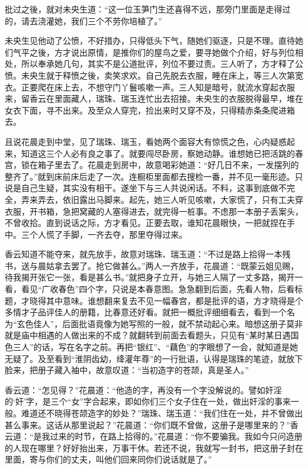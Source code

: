 \documentclass[a4paper,12pt,UTF8,twoside]{ctexbook}
\begin{document}
批过之後，就对未央生道：“这一位玉笋门生还喜得不远，那旁门里面是走得过的，请去浇灌她，我们三个不劳你培植了。”

未央生见他动了公愤，不好措办，只得低头下气，随她们驱逐，只是不理。直待她们气平之後，方才说出原情，是推你们的屋鸟之爱，要寻她做个介绍，好与列位相处，所以奉承她几句，其实不是公道批评，列位不要过责。三人听了，方才释了公愤。未央生就于释愤之後，卖笑求欢。自己先脱去衣服，睡在床上，等三人次第宽衣。正要爬在床上去，不想守门丫鬟咳嗽一声。三人知是暗号，就流水穿起衣服来，留香云在里面藏人，瑞珠、瑞玉连忙出去招接。未央生的衣服脱得最早，堆在女衣下面，寻不出来。及至众人穿完，捡出来时又穿不及，只得精赤条条爬进箱去。

且说花晨走到中堂，见了瑞珠、瑞玉，看她两个面容大有惊慌之色，心内疑惑起来，知道这三个人必有良之事了。就要闯尽卧房，察她动静。谁想她已把活跳的春宫，锁在箱子里去了。花晨走到房中，故意喝彩她道：“好几日不来，一发摆列的整齐了。”就到床前床后走了一次。连橱柜里面都去搜检一番，并不见一毫形迹。只说是自己生疑，其实没有相干。遂坐下与三人共说闲话。不料，这事到底做不完全，弄来弄去，依旧露出马脚来。起先，她三人听见咳嗽，大家慌了，只有工夫穿衣服，开书箱，急把窝藏的人塞得进去，就完得一桩事。不虑那一本册子丢案头，不曾收拾。直到说话之际，方才看见。正要去取，谁知花晨眼快，一把就捏在手中。三个人慌了手脚，一齐去夺，那里夺得过来。

香云知道不能夺来，就先放手，故意对瑞珠、瑞玉道：“不过是路上拾得一本残书，送与晨姑拿去罢了。抢它做甚么。”两人一齐放手，花晨道：“既蒙云姐见赐，待我揭开张它一张，看是甚么书。”就把身子立开，与她三人隔了一丈多路，揭开一看，看见“广收春色”四个字，只说是本春意图。急急翻到后面，先看人物，后看标题，才晓得其中意味。谁想翻来复去不见一幅春宫，都是批评的语，方才晓得是个多情才子品评佳人的册籍，比春意还好看。就把一概批评细细看去，看到一个名为“玄色佳人”，后面批语竟像为她写照的一般，就不禁动起心来。暗想这册子莫非就是庙中相遇的人做出来的不成？就翻转到前面去看题头，只见有“某时某日遇国色三人”的话，写在名字之前。再把“银红”、“藕色”的字眼想了一会，就知道是她无疑了。及至看到“淮阴齿幼，绛灌年尊”的一行批语，认得是瑞珠的笔迹，就放下脸来，把册子藏入袖中，故意叹道：“当初造字的苍颉，真是圣人。”

香云道：“怎见得？”花晨道：“他造的字，再没有一个字没解说的。譬如奸淫的‘奸’字，是三个“女”字合起来，即如你们三个女子住在一处，做出奸淫的事来一般。难道还不晓得苍颉造字的妙处？”瑞珠、瑞玉道：“我们住在一处，并不曾做出甚么事来。这话从那里说起？”花晨道：“你们既不曾做，这册子是哪里来的？”香云道：“是我过来的时节，在路上拾得的。”花晨道：“你不要骗我。我如今只问造册的人现在哪里？好好抬出来，万事干休。若还不说，我就写一封书，把这册子封在里面，寄与你们的丈夫，叫他们回来同你们说话就是了。”
\end{document}
